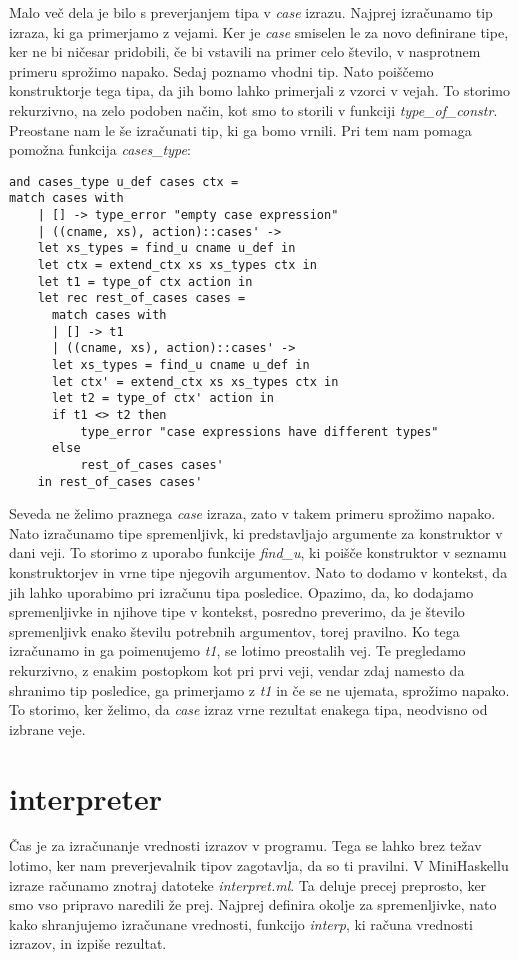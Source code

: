 \documentclass[12pt,a4paper,openany]{book}
\begin{document}
Malo več dela je bilo s preverjanjem tipa v \emph{case} izrazu. Najprej izračunamo tip izraza, ki ga primerjamo z vejami. Ker je \emph{case} smiselen le za novo definirane tipe, ker ne bi ničesar 
pridobili, če bi vstavili na primer celo število, v nasprotnem primeru sprožimo napako. Sedaj poznamo vhodni tip. Nato poiščemo konstruktorje tega tipa, da jih bomo lahko primerjali z vzorci v vejah.
To storimo rekurzivno, na zelo podoben način, kot smo to storili v funkciji \emph{type\_of\_constr}. Preostane nam le še izračunati tip, ki ga bomo vrnili. Pri tem nam pomaga pomožna funkcija 
\emph{cases\_type}:
\begin{lstlisting}
and cases_type u_def cases ctx =
match cases with
    | [] -> type_error "empty case expression"
    | ((cname, xs), action)::cases' ->
    let xs_types = find_u cname u_def in
    let ctx = extend_ctx xs xs_types ctx in
    let t1 = type_of ctx action in
    let rec rest_of_cases cases =
      match cases with
      | [] -> t1
      | ((cname, xs), action)::cases' ->
      let xs_types = find_u cname u_def in
      let ctx' = extend_ctx xs xs_types ctx in
      let t2 = type_of ctx' action in
      if t1 <> t2 then
          type_error "case expressions have different types"
      else
          rest_of_cases cases'
    in rest_of_cases cases'
\end{lstlisting}
Seveda ne želimo praznega \emph{case} izraza, zato v takem primeru sprožimo napako. Nato izračunamo tipe spremenljivk, ki predstavljajo argumente za konstruktor v dani veji. To storimo z uporabo
funkcije \emph{find\_u}, ki poišče konstruktor v seznamu konstruktorjev in vrne tipe njegovih argumentov. Nato to dodamo v kontekst, da jih lahko uporabimo pri izračunu tipa posledice. Opazimo, 
da, ko dodajamo spremenljivke in njihove tipe v kontekst, posredno preverimo, da je število spremenljivk enako številu potrebnih argumentov, torej pravilno. Ko tega izračunamo in ga 
poimenujemo \emph{t1}, se lotimo preostalih vej. Te pregledamo rekurzivno, z enakim postopkom kot pri prvi veji, vendar zdaj namesto da shranimo tip posledice, ga primerjamo z \emph{t1} in če 
se ne ujemata, sprožimo napako. To storimo, ker želimo, da \emph{case} izraz vrne rezultat enakega tipa, neodvisno od izbrane veje.

\section{interpreter}
Čas je za izračunanje vrednosti izrazov v programu. Tega se lahko brez težav lotimo, ker nam preverjevalnik tipov zagotavlja, da so ti pravilni. V MiniHaskellu izraze računamo znotraj datoteke 
\emph{interpret.ml}. Ta deluje precej preprosto, ker smo vso pripravo naredili že prej. Najprej definira okolje za spremenljivke, nato kako shranjujemo izračunane vrednosti, funkcijo 
\emph{interp}, ki računa vrednosti izrazov, in izpiše rezultat. 
\end{document}
